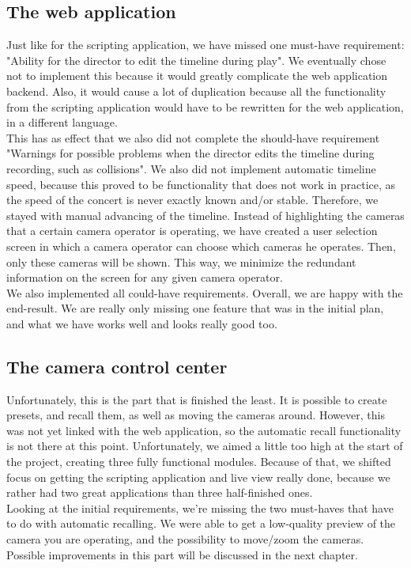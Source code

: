 \subsection{The web application}
Just like for the scripting application, we have missed one must-have requirement: "Ability for the director to edit the timeline during play". We eventually chose not to implement this because it would greatly complicate the web application backend. Also, it would cause a lot of duplication because all the functionality from the scripting application would have to be rewritten for the web application, in a different language.\\
This has as effect that we also did not complete the should-have requirement "Warnings for possible problems when the director edits the timeline during recording, such as collisions". We also did not implement automatic timeline speed, because this proved to be functionality that does not work in practice, as the speed of the concert is never exactly known and/or stable. Therefore, we stayed with manual advancing of the timeline. Instead of highlighting the cameras that a certain camera operator is operating, we have created a user selection screen in which a camera operator can choose which cameras he operates. Then, only these cameras will be shown. This way, we minimize the redundant information on the screen for any given camera operator.\\
We also implemented all could-have requirements. Overall, we are happy with the end-result. We are really only missing one feature that was in the initial plan, and what we have works well and looks really good too.

\subsection{The camera control center}
Unfortunately, this is the part that is finished the least. It is possible to create presets, and recall them, as well as moving the cameras around. However, this was not yet linked with the web application, so the automatic recall functionality is not there at this point. Unfortunately, we aimed a little too high at the start of the project, creating three fully functional modules. Because of that, we shifted focus on getting the scripting application and live view really done, because we rather had two great applications than three half-finished ones.\\
Looking at the initial requirements, we're missing the two must-haves that have to do with automatic recalling. We were able to get a low-quality preview of the camera you are operating, and the possibility to move/zoom the cameras.\\
Possible improvements in this part will be discussed in the next chapter.

